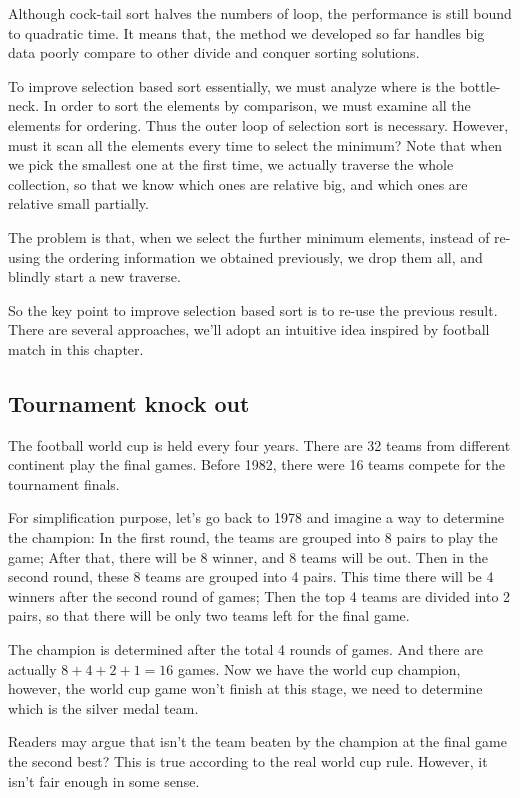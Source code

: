 \documentclass{article}
\begin{document}
Although cock-tail sort halves the numbers of loop, the performance is still bound to quadratic time.
It means that, the method we developed so far handles big data poorly compare to other divide and conquer
sorting solutions.

To improve selection based sort essentially, we must analyze where is the bottle-neck. In order to sort
the elements by comparison, we must examine all the elements for ordering. Thus the outer loop of selection
sort is necessary. However, must it scan all the elements every time to select the minimum? Note that
when we pick the smallest one at the first time, we actually traverse the whole collection, so that
we know which ones are relative big, and which ones are relative small partially.

The problem is that, when we select the further minimum elements, instead of re-using the ordering information
we obtained previously, we drop them all, and blindly start a new traverse.

So the key point to improve selection based sort is to re-use the previous result. There are several approaches,
we'll adopt an intuitive idea inspired by football match in this chapter.

\subsection{Tournament knock out}
The football world cup is held every four years. There are 32 teams from different continent
play the final games. Before 1982, there were 16 teams compete for the tournament finals\cite{wiki-wc}.

For simplification purpose, let's go back to 1978 and imagine a way to determine the champion:
In the first round, the teams
are grouped into 8 pairs to play the game; After that, there will be 8 winner, and 8 teams will
be out. Then in the second round, these 8 teams are grouped into 4 pairs. This time there
will be 4 winners after the second round of games; Then the top 4 teams are divided into
2 pairs, so that there will be only two teams left for the final game.

The champion is determined after the total 4 rounds of games. And there are actually $8+4+2+1 = 16$
games. Now we have the world cup champion, however, the world cup game won't finish at this stage,
we need to determine which is the silver medal team.

Readers may argue that isn't the team beaten by the champion at the final game the second best?
This is true according to the real world cup rule. However, it isn't fair enough in some sense.
\end{document}
